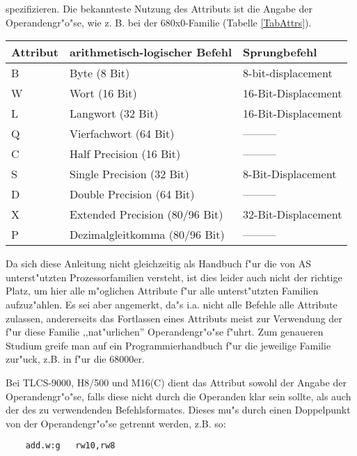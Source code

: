 \documentclass[12pt,a4paper,twoside]{report}
\begin{document}
spezifizieren.  Die bekannteste Nutzung des Attributs ist die Angabe der
Operandengr"o"se, wie z. B. bei der 680x0-Familie (Tabelle
\ref{TabAttrs}).
\begin{table*}[htb]
\begin{center}\begin{tabular}{|l|l|l|}
\hline
Attribut & arithmetisch-logischer Befehl & Sprungbefehl \\
\hline
\hline
B     & Byte (8 Bit)                   & 8-bit-displacement \\
W     & Wort (16 Bit)                  & 16-Bit-Displacement \\
L     & Langwort (32 Bit)              & 16-Bit-Displacement \\
Q     & Vierfachwort (64 Bit)          & --------- \\
C     & Half Precision (16 Bit)        & --------- \\
S     & Single Precision (32 Bit)      & 8-Bit-Displacement \\
D     & Double Precision (64 Bit)      & --------- \\
X     & Extended Precision (80/96 Bit) & 32-Bit-Displacement \\
P     & Dezimalgleitkomma (80/96 Bit)  & --------- \\
\hline
\end{tabular}\end{center}
\caption{Erlaubte Attribute (Beispiel 680x0) \label{TabAttrs}}
\end{table*}
\par
Da sich diese Anleitung nicht gleichzeitig als Handbuch f"ur die von AS
unterst"utzten Prozessorfamilien versteht, ist dies leider auch nicht der
richtige Platz, um hier alle m"oglichen Attribute f"ur alle unterst"utzten
Familien aufzuz"ahlen.  Es sei aber angemerkt, da"s i.a. nicht alle Befehle
alle Attribute zulassen, andererseits das Fortlassen eines Attributs meist
zur Verwendung der f"ur diese Familie ,,nat"urlichen'' Operandengr"o"se
f"uhrt.  Zum genaueren Studium greife man auf ein Programmierhandbuch f"ur
die jeweilige Familie zur"uck, z.B. in \cite{Williams} f"ur die 68000er.
\par
Bei TLCS-9000, H8/500 und M16(C) dient das Attribut sowohl der Angabe der
Operandengr"o"se, falls diese nicht durch die Operanden klar sein sollte,
als auch der des zu verwendenden Befehlsformates.
Dieses mu"s durch einen Doppelpunkt von der Operandengr"o"se getrennt werden,
z.B. so:
\begin{verbatim}
    add.w:g   rw10,rw8
\end{verbatim}
\end{document}
